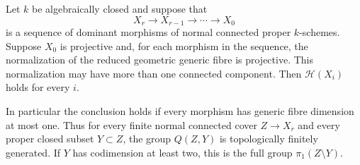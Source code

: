 \begin{theorem}
\label{D:iterated-fibration-generation}
Let $k$ be algebraically closed and suppose that
\[
 X_r\longrightarrow X_{r-1}\longrightarrow\cdots
       \longrightarrow X_0
\]
is a sequence of dominant morphisms of normal connected
proper $k$-schemes.  Suppose $X_0$ is projective and, for
each morphism in the sequence, the normalization of the
reduced geometric generic fibre is projective.  This
normalization may have more than one connected component.
Then $\mathcal H(X_i)$ holds for every $i$.

In particular the conclusion holds if every morphism has
generic fibre dimension at most one.  Thus for every finite
normal connected cover $Z\to X_r$ and every proper closed
subset $Y\subset Z$, the group $Q(Z,Y)$ is topologically
finitely generated.  If $Y$ has codimension at least two,
this is the full group $\pi_1(Z\setminus Y)$.
\end{theorem}
